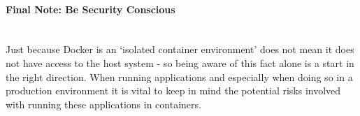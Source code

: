 \documentclass{article}
\begin{document}
\paragraph{Final Note: Be Security Conscious}\mbox{}\\
Just because Docker is an `isolated container environment' does not mean it does not have access to the host system - so being aware of this fact alone is a start in the right direction. When running applications and especially when doing so in a production environment it is vital to keep in mind the potential risks involved with running these applications in containers.

\newpage

\end{document}
